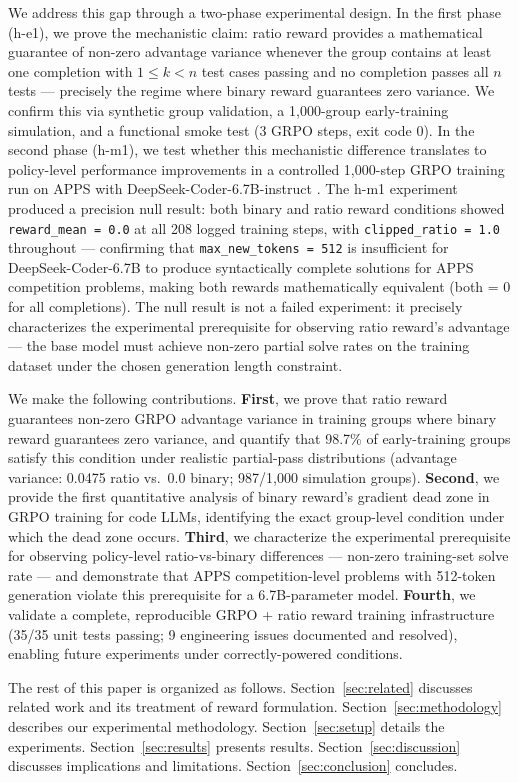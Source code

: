 We address this gap through a two-phase experimental design. In the first phase (h-e1), we prove the mechanistic claim: ratio reward provides a mathematical guarantee of non-zero advantage variance whenever the group contains at least one completion with $1 \leq k < n$ test cases passing and no completion passes all $n$ tests --- precisely the regime where binary reward guarantees zero variance. We confirm this via synthetic group validation, a 1,000-group early-training simulation, and a functional smoke test (3 GRPO steps, exit code 0). In the second phase (h-m1), we test whether this mechanistic difference translates to policy-level performance improvements in a controlled 1,000-step GRPO training run on APPS \citep{hendrycks2021apps} with DeepSeek-Coder-6.7B-instruct \citep{guo2024deepseek}. The h-m1 experiment produced a precision null result: both binary and ratio reward conditions showed \texttt{reward\_mean = 0.0} at all 208 logged training steps, with \texttt{clipped\_ratio = 1.0} throughout --- confirming that \texttt{max\_new\_tokens = 512} is insufficient for DeepSeek-Coder-6.7B to produce syntactically complete solutions for APPS competition problems, making both rewards mathematically equivalent (both = 0 for all completions). The null result is not a failed experiment: it precisely characterizes the experimental prerequisite for observing ratio reward's advantage --- the base model must achieve non-zero partial solve rates on the training dataset under the chosen generation length constraint.

We make the following contributions. \textbf{First}, we prove that ratio reward guarantees non-zero GRPO advantage variance in training groups where binary reward guarantees zero variance, and quantify that 98.7\% of early-training groups satisfy this condition under realistic partial-pass distributions (advantage variance: 0.0475 ratio vs.\ 0.0 binary; 987/1,000 simulation groups). \textbf{Second}, we provide the first quantitative analysis of binary reward's gradient dead zone in GRPO training for code LLMs, identifying the exact group-level condition under which the dead zone occurs. \textbf{Third}, we characterize the experimental prerequisite for observing policy-level ratio-vs-binary differences --- non-zero training-set solve rate --- and demonstrate that APPS competition-level problems with 512-token generation violate this prerequisite for a 6.7B-parameter model. \textbf{Fourth}, we validate a complete, reproducible GRPO + ratio reward training infrastructure (35/35 unit tests passing; 9 engineering issues documented and resolved), enabling future experiments under correctly-powered conditions.

The rest of this paper is organized as follows. Section~\ref{sec:related} discusses related work and its treatment of reward formulation. Section~\ref{sec:methodology} describes our experimental methodology. Section~\ref{sec:setup} details the experiments. Section~\ref{sec:results} presents results. Section~\ref{sec:discussion} discusses implications and limitations. Section~\ref{sec:conclusion} concludes.
